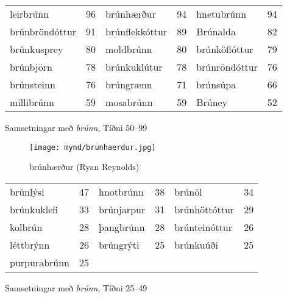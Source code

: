\documentclass[../samsetningasafn.tex]{subfiles}
\begin{document}
\begin{wordlist}[H]
\begin{tcolorbox}

	\setlength{\extrarowheight}{3pt}
	\begin{tabular}{BlBlBl}
		leirbrúnn	& 96		& 	
		brúnhærður	& 94		& 
		hnetubrúnn	& 94		\\  
		brúnbröndóttur & 91		& 	
		brúnflekkóttur &	89		& 		
		Brúnalda	&	82		\\ 		
		brúnkusprey	& 80		& 	
		moldbrúnn	& 80		& 		
		brúnköflóttur	& 79		\\ 	
		brúnbjörn	& 78		& 	
		brúnkuklútur	& 78		& 	
		brúnröndóttur & 76		\\ 	
		brúnsteinn	& 76		& 		
		brúngrænn	& 71		& 	
		brúnsúpa	& 66		\\ 		
		millibrúnn	& 59		& 		
		mosabrúnn	& 59		& 	
		Brúney		& 52				
	\end{tabular}

\end{tcolorbox}
	\caption{Samsetningar með \textit{brúnn}, Tíðni 50--99}
	\label{listi:brunt.50}
\end{wordlist}

\begin{figure}[H]
\begin{tcolorbox}
\centering
	\texttt{[image: mynd/brunhaerdur.jpg]}
\end{tcolorbox}
	\caption{brúnhærður (Ryan Reynolds)}
	\label{mynd:brunhaerdur}
\end{figure}

\begin{wordlist}[H]
\begin{tcolorbox}

	\setlength{\extrarowheight}{3pt}
	\begin{tabular}{BlBlBl}	
		brúnlýsi		& 47		& 
		hnotbrúnn	&	38		& 	
		brúnöl		& 34		\\ 		
		brúnkuklefi	& 33		& 	
		brúnjarpur	& 31		& 	
		brúnhöttóttur & 29		\\ 
		kolbrún		& 28		& 	
		þangbrúnn	& 28		& 
		brúnteinóttur & 26		\\		
		léttbrýnn	& 26		& 	
		brúngrýti	& 25		& 	
		brúnkuúði	& 25		\\ 	
		purpurabrúnn & 25		& 	
					&			&
					&
	\end{tabular}

\end{tcolorbox}
	\caption{Samsetningar með \textit{brúnn}, Tíðni 25--49}
	\label{listi:brunt.25}
\end{wordlist}
\end{document}
